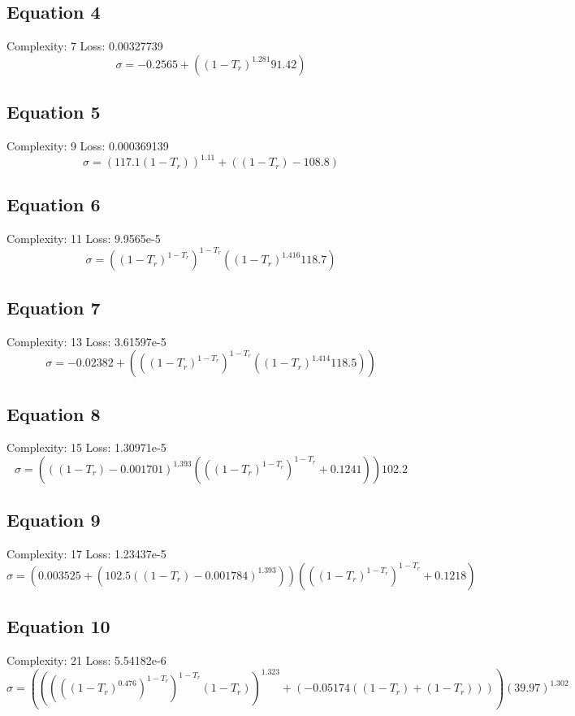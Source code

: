 \documentclass[11pt]{article}
\begin{document}
\subsection*{Equation 4}
\noindent Complexity: 7 \quad Loss: 0.00327739 \\[4pt]
\[
\sigma = -0.2565 + (\left(1 - T_r\right)^{1.281} 91.42)
\]

\subsection*{Equation 5}
\noindent Complexity: 9 \quad Loss: 0.000369139 \\[4pt]
\[
\sigma = \left(117.1 (1 - T_r)\right)^{1.11} + ((1 - T_r) -108.8)
\]

\subsection*{Equation 6}
\noindent Complexity: 11 \quad Loss: 9.9565e-5 \\[4pt]
\[
\sigma = \left(\left(1 - T_r\right)^{1 - T_r}\right)^{1 - T_r} (\left(1 - T_r\right)^{1.416} 118.7)
\]

\subsection*{Equation 7}
\noindent Complexity: 13 \quad Loss: 3.61597e-5 \\[4pt]
\[
\sigma = -0.02382 + (\left(\left(1 - T_r\right)^{1 - T_r}\right)^{1 - T_r} (\left(1 - T_r\right)^{1.414} 118.5))
\]

\subsection*{Equation 8}
\noindent Complexity: 15 \quad Loss: 1.30971e-5 \\[4pt]
\[
\sigma = (\left((1 - T_r) - 0.001701\right)^{1.393} (\left(\left(1 - T_r\right)^{1 - T_r}\right)^{1 - T_r} + 0.1241)) 102.2
\]

\subsection*{Equation 9}
\noindent Complexity: 17 \quad Loss: 1.23437e-5 \\[4pt]
\[
\sigma = (0.003525 + (102.5 \left((1 - T_r) - 0.001784\right)^{1.393})) (\left(\left(1 - T_r\right)^{1 - T_r}\right)^{1 - T_r} + 0.1218)
\]

\subsection*{Equation 10}
\noindent Complexity: 21 \quad Loss: 5.54182e-6 \\[4pt]
\[
\sigma = (\left(\left(\left(\left(1 - T_r\right)^{0.476}\right)^{1 - T_r}\right)^{1 - T_r} (1 - T_r)\right)^{1.323} + (-0.05174 ((1 - T_r) + (1 - T_r)))) \left(39.97\right)^{1.302}
\]
\end{document}
